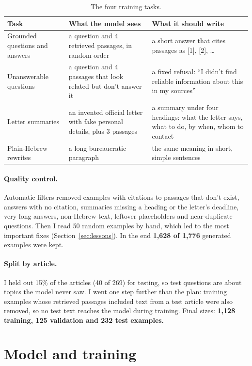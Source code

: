 \documentclass[11pt]{article}
\begin{document}
\begin{table}[ht]
\centering
\small
\begin{tabularx}{\textwidth}{@{}p{3.1cm}YY@{}}
\toprule
\textbf{Task} & \textbf{What the model sees} & \textbf{What it should write} \\
\midrule
Grounded questions and answers & a question and 4 retrieved passages, in random order & a short answer that cites passages as [1], [2], \dots \\
Unanswerable questions & a question and 4 passages that look related but don't answer it & a fixed refusal: ``I didn't find reliable information about this in my sources'' \\
Letter summaries & an invented official letter with fake personal details, plus 3 passages & a summary under four headings: what the letter says, what to do, by when, whom to contact \\
Plain-Hebrew rewrites & a long bureaucratic paragraph & the same meaning in short, simple sentences \\
\bottomrule
\end{tabularx}
\caption{The four training tasks.}
\label{tab:tasks}
\end{table}

\paragraph{Quality control.} Automatic filters removed examples with citations to passages that don't exist, answers with no citation, summaries missing a heading or the letter's deadline, very long answers, non-Hebrew text, leftover placeholders and near-duplicate questions. Then I read 50 random examples by hand, which led to the most important fixes (Section~\ref{sec:lessons}). In the end \textbf{1,628 of 1,776} generated examples were kept.

\paragraph{Split by article.} I held out 15\% of the articles (40 of 269) for testing, so test questions are about topics the model never saw. I went one step further than the plan: training examples whose retrieved passages included text from a test article were also removed, so no test text reaches the model during training. Final sizes: \textbf{1,128 training, 125 validation and 232 test examples.}

\section{Model and training}
\end{document}
